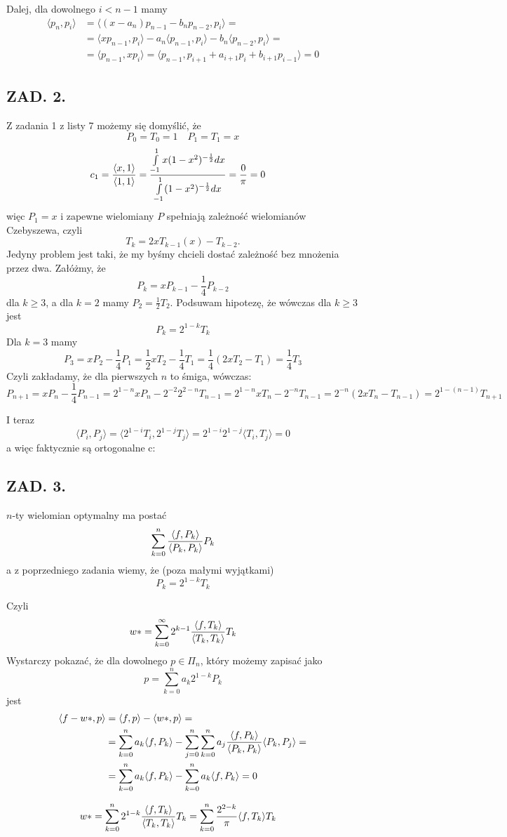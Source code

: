 \documentclass{article}[16pt]
\begin{document}
Dalej, dla dowolnego $i<n-1$ mamy
\begin{align*}
    \langle p_n,p_i\rangle&=\langle (x-a_n)p_{n-1}-b_np_{n-2},p_i\rangle=\\
    &=\langle xp_{n-1},p_i\rangle-a_n\langle p_{n-1},p_i\rangle -b_n\langle p_{n-2},p_i\rangle=\\
    &=\langle p_{n-1},xp_i\rangle=\langle p_{n-1},p_{i+1}+a_{i+1}p_i+b_{i+1}p_{i-1}\rangle =0
\end{align*}

\subsection*{ZAD. 2.}

Z zadania 1 z listy 7 możemy się domyślić, że
$$P_0=T_0=1\quad P_1=T_1=x$$
\begin{align*}
    c_1&={\langle x, 1\rangle\over\langle 1, 1\rangle}={\int\limits_{-1}^1x(1-x^2)^{-\frac12}dx\over \int\limits_{-1}^1(1-x^2)^{-\frac12}dx}={0\over \pi}=0
\end{align*}
więc $P_1=x$ i zapewne wielomiany $P$ spełniają zależność wielomianów Czebyszewa, czyli
$$T_k=2xT_{k-1}(x)- T_{k-2}.$$
Jedyny problem jest taki, że my byśmy chcieli dostać zależność bez mnożenia przez dwa. Załóżmy, że
$$P_k=xP_{k-1}-\frac14P_{k-2}$$
dla $k\geq 3$, a dla $k=2$ mamy $P_2=\frac12 T_2$. Podsuwam hipotezę, że wówczas dla $k\geq 3$ jest
$$P_k={2^{1-k}}T_k$$
Dla $k=3$ mamy
$$P_3=xP_2-\frac14P_1=\frac12xT_2-\frac14T_1=\frac14(2xT_2-T_1)=\frac14T_3$$
Czyli zakładamy, że dla pierwszych $n$ to śmiga, wówczas:
$$P_{n+1}=xP_n-\frac14P_{n-1}=2^{1-n}xP_n-2^{-2}2^{2-n}T_{n-1}=2^{1-n}xT_n-2^{-n}T_{n-1}=2^{-n}(2xT_n-T_{n-1})=2^{1-(n-1)}T_{n+1}$$

I teraz
$$\langle P_i, P_j\rangle=\langle 2^{1-i}T_i, 2^{1-j}T_j\rangle=2^{1-i}2^{1-j}\langle T_i,T_j\rangle=0$$
a więc faktycznie są ortogonalne c:

\subsection*{ZAD. 3.}

$n$-ty wielomian optymalny ma postać
$$\sum\limits_{k=0}^n{\langle f, P_k\rangle\over\langle P_k,P_k\rangle}P_k$$
a z poprzedniego zadania wiemy, że (poza małymi wyjątkami)
$$P_k=2^{1-k}T_k$$

Czyli
$$w*=\sum\limits_{k=0}^\infty 2^{k-1}{\langle f, T_k\rangle\over \langle T_k, T_k\rangle}T_k$$
Wystarczy pokazać, że dla dowolnego $p\in \Pi_n$, który możemy zapisać jako
$$p=\sum\limits_{k=0}^na_k2^{1-k}P_k$$
jest
\begin{align*}
    \langle f-w*,p\rangle&=\langle f, p\rangle-\langle w*,p\rangle=\\
    &=\sum\limits_{k=0}^na_k\langle f, P_k\rangle-\sum\limits_{j=0}^n\sum\limits_{k=0}^na_j{\langle f, P_k\rangle\over\langle P_k, P_k\rangle}\langle P_k, P_j\rangle=\\
    &=\sum\limits_{k=0}^na_k\langle f, P_k\rangle-\sum\limits_{k=0}^na_k{\langle f, P_k\rangle}=0
\end{align*}

\begin{align*}
    w*&=\sum\limits_{k=0}^n2^{1-k}{\langle f, T_k\rangle\over \langle T_k, T_k\rangle}T_k=\sum\limits_{k=0}^n{2^{2-k}\over \pi}\langle f, T_k\rangle T_k
\end{align*}
\end{document}

